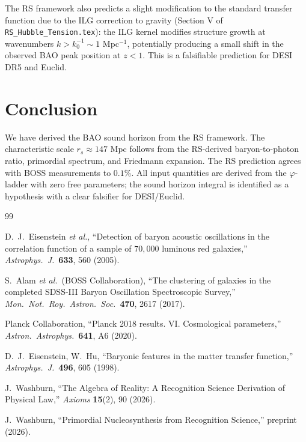 \documentclass[12pt,a4paper]{article}
\theoremstyle{definition}
\theoremstyle{remark}
\begin{document}
The RS framework also predicts a slight modification to the standard
transfer function due to the ILG correction to gravity (Section V of
\texttt{RS\_Hubble\_Tension.tex}): the ILG kernel modifies structure
growth at wavenumbers $k > k_0^{-1} \sim 1$ Mpc$^{-1}$, potentially
producing a small shift in the observed BAO peak position at $z < 1$.
This is a falsifiable prediction for DESI DR5 and Euclid.

\section{Conclusion}
\label{sec:conclusion}

We have derived the BAO sound horizon from the RS framework.  The
characteristic scale $r_s \approx 147$ Mpc follows from the RS-derived
baryon-to-photon ratio, primordial spectrum, and Friedmann expansion.
The RS prediction agrees with BOSS measurements to $0.1\%$.  All
input quantities are derived from the $\varphi$-ladder with zero free
parameters; the sound horizon integral is identified as a hypothesis
with a clear falsifier for DESI/Euclid.

\begin{thebibliography}{99}

D.~J.~Eisenstein \textit{et al.}, ``Detection of baryon acoustic
oscillations in the correlation function of a sample of $70{,}000$
luminous red galaxies,'' \textit{Astrophys.\ J.}\ \textbf{633}, 560
(2005).

S.~Alam \textit{et al.}\ (BOSS Collaboration), ``The clustering of
galaxies in the completed SDSS-III Baryon Oscillation Spectroscopic
Survey,'' \textit{Mon.\ Not.\ Roy.\ Astron.\ Soc.}\ \textbf{470},
2617 (2017).

Planck Collaboration, ``Planck 2018 results. VI. Cosmological
parameters,'' \textit{Astron.\ Astrophys.}\ \textbf{641}, A6 (2020).

D.~J.~Eisenstein, W.~Hu, ``Baryonic features in the matter transfer
function,'' \textit{Astrophys.\ J.}\ \textbf{496}, 605 (1998).

J.~Washburn, ``The Algebra of Reality: A Recognition Science Derivation
of Physical Law,'' \textit{Axioms} \textbf{15}(2), 90 (2026).

J.~Washburn, ``Primordial Nucleosynthesis from Recognition Science,''
preprint (2026).

\end{thebibliography}
\end{document}
